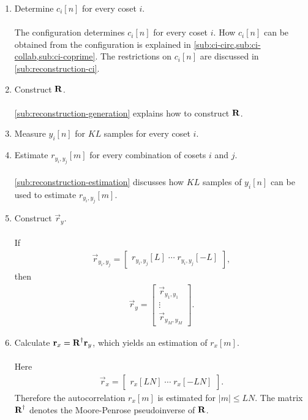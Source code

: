 \documentclass[a4paper, openany, oneside]{memoir}
\begin{document}
\begin{enumerate}[labelindent=0pt,labelwidth=\widthof{\ref{last-item1}},label=Step \arabic*:,itemindent=1em,leftmargin=!]
    \item Determine $c_i[n]$ for every coset $i$. \\ \\
    The configuration determines $c_i[n]$ for every coset $i$. How $c_i[n]$ can be obtained from the configuration is explained in \cref{sub:ci-circ,sub:ci-collab,sub:ci-coprime}. The restrictions on $c_i[n]$ are discussed in \cref{sub:reconstruction-ci}. \\
    \item Construct $\boldsymbol{\mathbf{R}}$. \\ \\
    \cref{sub:reconstruction-generation} explains how to construct $\boldsymbol{\mathbf{R}}$. \\
    \item Measure $y_i[n]$ for $KL$ samples for every coset $i$. \\
    \item Estimate $r_{y_i,y_j}[m]$ for every combination of cosets $i$ and $j$. \\ \\
    \cref{sub:reconstruction-estimation} discusses how $KL$ samples of $y_i[n]$ can be used to estimate $r_{y_i,y_j}[m]$. \\
    \item Construct $\vec{r}_y$. \\ \\
    If
    \begin{align*}
        \vec{r}_{y_i,y_j} = \begin{bmatrix}
            r_{y_i,y_j}[L] \; \cdots \; r_{y_i,y_j}[-L]
        \end{bmatrix},
    \end{align*}
    then
    \begin{align*}
        \vec{r}_y = \begin{bmatrix}
            \vec{r}_{y_1,y_1} \\ \vdots \\ \vec{r}_{y_M,y_M}
        \end{bmatrix}.
    \end{align*}
    \item Calculate $\boldsymbol{\mathbf{r}}_x=\boldsymbol{\mathbf{R}}^\dagger \boldsymbol{\mathbf{r}}_y$, which yields an estimation of $r_x[m]$. \\ \\
    Here
    \begin{align*}
         \vec{r}_x = \begin{bmatrix}
             r_x[LN] \; \cdots \; r_x[-LN]
         \end{bmatrix}.
    \end{align*} Therefore the autocorrelation $r_x[m]$ is estimated for $|m| \le LN$. The matrix $\boldsymbol{\mathbf{R}}^\dagger$ denotes the Moore-Penrose pseudoinverse of $\boldsymbol{\mathbf{R}}$. \\
    \label{last-item1}
\end{enumerate}
\end{document}
